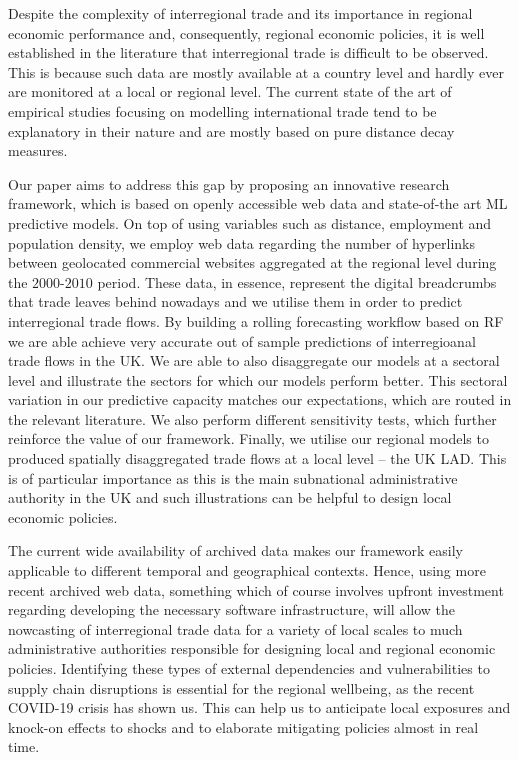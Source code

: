 \documentclass[]{interact}
\theoremstyle{plain}%
\theoremstyle{definition}
\theoremstyle{remark}
\begin{document}
Despite the complexity of interregional trade and its importance in
regional economic performance and, consequently, regional economic
policies, it is well established in the literature that interregional
trade is difficult to be observed. This is because such data are mostly
available at a country level and hardly ever are monitored at a local or
regional level. The current state of the art of empirical studies
focusing on modelling international trade tend to be explanatory in
their nature and are mostly based on pure distance decay measures.

Our paper aims to address this gap by proposing an innovative research
framework, which is based on openly accessible web data and state-of-the
art ML predictive models. On top of using variables such as distance,
employment and population density, we employ web data regarding the
number of hyperlinks between geolocated commercial websites aggregated
at the regional level during the \(2000\)-\(2010\) period. These data,
in essence, represent the digital breadcrumbs that trade leaves behind
nowadays and we utilise them in order to predict interregional trade
flows. By building a rolling forecasting workflow based on RF we are
able achieve very accurate out of sample predictions of interregioanal
trade flows in the UK. We are able to also disaggregate our models at a
sectoral level and illustrate the sectors for which our models perform
better. This sectoral variation in our predictive capacity matches our
expectations, which are routed in the relevant literature. We also
perform different sensitivity tests, which further reinforce the value
of our framework. Finally, we utilise our regional models to produced
spatially disaggregated trade flows at a local level -- the UK LAD. This
is of particular importance as this is the main subnational
administrative authority in the UK and such illustrations can be helpful
to design local economic policies.

The current wide availability of archived data makes our framework
easily applicable to different temporal and geographical contexts.
Hence, using more recent archived web data, something which of course
involves upfront investment regarding developing the necessary software
infrastructure, will allow the nowcasting of interregional trade data
for a variety of local scales to much administrative authorities
responsible for designing local and regional economic policies.
Identifying these types of external dependencies and vulnerabilities to
supply chain disruptions is essential for the regional wellbeing, as the
recent COVID-19 crisis has shown us. This can help us to anticipate
local exposures and knock-on effects to shocks and to elaborate
mitigating policies almost in real time.



\end{document}
